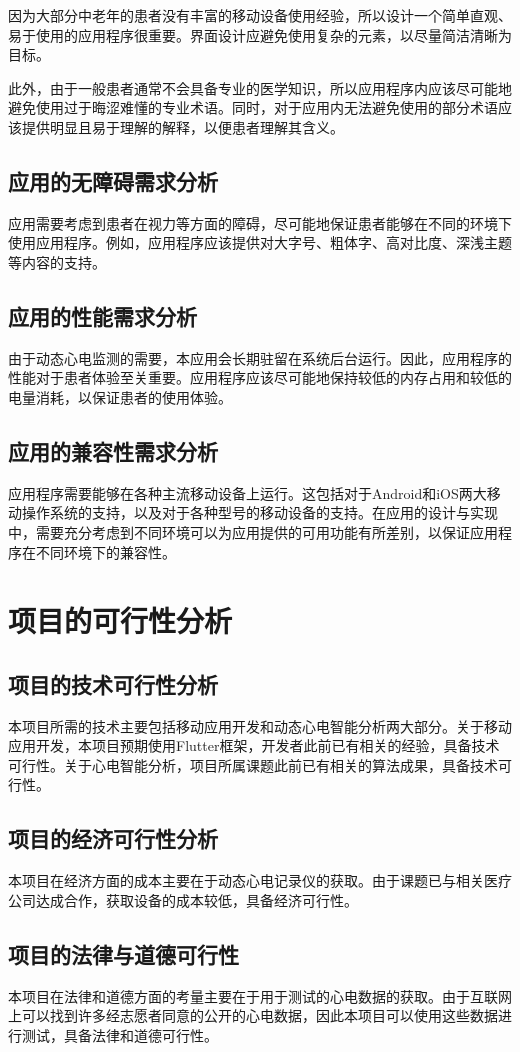 因为大部分中老年的患者没有丰富的移动设备使用经验，所以设计一个简单直观、易于使用的应用程序很重要。界面设计应避免使用复杂的元素，以尽量简洁清晰为目标。

此外，由于一般患者通常不会具备专业的医学知识，所以应用程序内应该尽可能地避免使用过于晦涩难懂的专业术语。同时，对于应用内无法避免使用的部分术语应该提供明显且易于理解的解释，以便患者理解其含义。

\subsection{应用的无障碍需求分析}\label{subsec:accessibility}

应用需要考虑到患者在视力等方面的障碍，尽可能地保证患者能够在不同的环境下使用应用程序。例如，应用程序应该提供对大字号、粗体字、高对比度、深浅主题等内容的支持。

\subsection{应用的性能需求分析}\label{subsec:performance}

由于动态心电监测的需要，本应用会长期驻留在系统后台运行。因此，应用程序的性能对于患者体验至关重要。应用程序应该尽可能地保持较低的内存占用和较低的电量消耗，以保证患者的使用体验。

\subsection{应用的兼容性需求分析}\label{subsec:compatibility}

应用程序需要能够在各种主流移动设备上运行。这包括对于Android和iOS两大移动操作系统的支持，以及对于各种型号的移动设备的支持。在应用的设计与实现中，需要充分考虑到不同环境可以为应用提供的可用功能有所差别，以保证应用程序在不同环境下的兼容性。


\section{项目的可行性分析}\label{sec:feasibility}

\subsection{项目的技术可行性分析}\label{subsec:tech-feasibility}

本项目所需的技术主要包括移动应用开发和动态心电智能分析两大部分。关于移动应用开发，本项目预期使用Flutter框架，开发者此前已有相关的经验，具备技术可行性。关于心电智能分析，项目所属课题此前已有相关的算法成果\cite{songDongtaixindiantudezhinengjiancesuanfayanjiuyuyingyong2022}，具备技术可行性。

\subsection{项目的经济可行性分析}\label{subsec:economic-feasibility}

本项目在经济方面的成本主要在于动态心电记录仪的获取。由于课题已与相关医疗公司达成合作，获取设备的成本较低，具备经济可行性。

\subsection{项目的法律与道德可行性}\label{subsec:legal-feasibility}

本项目在法律和道德方面的考量主要在于用于测试的心电数据的获取。由于互联网上可以找到许多经志愿者同意的公开的心电数据，因此本项目可以使用这些数据进行测试，具备法律和道德可行性。
